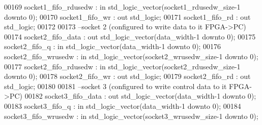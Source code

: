 \begin{DoxyCode}
00169         socket1_fifo_rdusedw        : \textcolor{keywordflow}{in} \textcolor{comment}{std\_logic\_vector}(socket1_rdusedw_size\textcolor{vhdlchar}{-}\textcolor{vhdllogic}{}\textcolor{vhdllogic}{1} \textcolor{keywordflow}{downto} \textcolor{vhdllogic}{}\textcolor{vhdllogic}{0});
00170         socket1_fifo_wr         : \textcolor{keywordflow}{out} \textcolor{comment}{std\_logic};
00171         socket1_fifo_rd         : \textcolor{keywordflow}{out} \textcolor{comment}{std\_logic};
00172 
00173 \textcolor{keyword}{        --socket 2 (configured to write data to it FPGA->PC)}
00174         socket2_fifo_data           : \textcolor{keywordflow}{out} \textcolor{comment}{std\_logic\_vector}(data_width\textcolor{vhdlchar}{-}\textcolor{vhdllogic}{}\textcolor{vhdllogic}{1} \textcolor{keywordflow}{downto} \textcolor{vhdllogic}{}\textcolor{vhdllogic}{0});
00175         socket2_fifo_q              : \textcolor{keywordflow}{in} \textcolor{comment}{std\_logic\_vector}(data_width\textcolor{vhdlchar}{-}\textcolor{vhdllogic}{}\textcolor{vhdllogic}{1} \textcolor{keywordflow}{downto} \textcolor{vhdllogic}{}\textcolor{vhdllogic}{0});
00176         socket2_fifo_wrusedw        : \textcolor{keywordflow}{in} \textcolor{comment}{std\_logic\_vector}(socket2_wrusedw_size\textcolor{vhdlchar}{-}\textcolor{vhdllogic}{}\textcolor{vhdllogic}{1} \textcolor{keywordflow}{downto} \textcolor{vhdllogic}{}\textcolor{vhdllogic}{0});
00177         socket2_fifo_rdusedw        : \textcolor{keywordflow}{in} \textcolor{comment}{std\_logic\_vector}(socket2_rdusedw_size\textcolor{vhdlchar}{-}\textcolor{vhdllogic}{}\textcolor{vhdllogic}{1} \textcolor{keywordflow}{downto} \textcolor{vhdllogic}{}\textcolor{vhdllogic}{0});
00178         socket2_fifo_wr         : \textcolor{keywordflow}{out} \textcolor{comment}{std\_logic};
00179         socket2_fifo_rd         : \textcolor{keywordflow}{out} \textcolor{comment}{std\_logic};
00180 
00181 \textcolor{keyword}{        --socket 3 (configured to write control data to it FPGA->PC)}
00182         socket3_fifo_data           : \textcolor{keywordflow}{out} \textcolor{comment}{std\_logic\_vector}(data_width\textcolor{vhdlchar}{-}\textcolor{vhdllogic}{}\textcolor{vhdllogic}{1} \textcolor{keywordflow}{downto} \textcolor{vhdllogic}{}\textcolor{vhdllogic}{0});
00183         socket3_fifo_q              : \textcolor{keywordflow}{in} \textcolor{comment}{std\_logic\_vector}(data_width\textcolor{vhdlchar}{-}\textcolor{vhdllogic}{}\textcolor{vhdllogic}{1} \textcolor{keywordflow}{downto} \textcolor{vhdllogic}{}\textcolor{vhdllogic}{0});
00184         socket3_fifo_wrusedw        : \textcolor{keywordflow}{in} \textcolor{comment}{std\_logic\_vector}(socket3_wrusedw_size\textcolor{vhdlchar}{-}\textcolor{vhdllogic}{}\textcolor{vhdllogic}{1} \textcolor{keywordflow}{downto} \textcolor{vhdllogic}{}\textcolor{vhdllogic}{0});

\end{DoxyCode}
